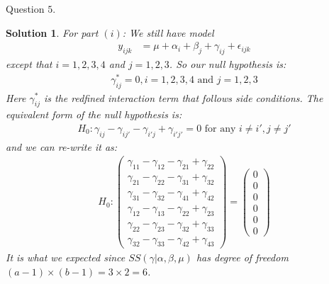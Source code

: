 \documentclass[11pt]{article}
\newtheorem{sol}{Solution}
\begin{document}
Question $5$.
\begin{sol}
	For part $(i)$:\vskip 2mm
	We still have model
	\begin{align*}
		y_{ijk} &= \mu + \alpha_i + \beta_j + \gamma_{ij} + \epsilon_{ijk}
	\end{align*}
	except that $i = 1, 2, 3, 4$ and $j = 1, 2, 3$. So our null hypothesis is:
	\begin{align*}
		\gamma^{\ast}_{ij} = 0, i = 1 , 2, 3, 4 \text{ and }j = 1, 2, 3
	\end{align*}
	Here $\gamma^{\ast}_{ij}$ is the redfined interaction term that follows side conditions.\vskip 2mm
	The equivalent form of the null hypothesis is:
	\begin{align*}
		H_0: \gamma_{ij} - \gamma_{ij'} - \gamma_{i'j} + \gamma_{i'j'} = 0 \text{ for any }i \neq i', j \neq j'
	\end{align*}
	and we can re-write it as:
	\begin{align*}
		H_0: \left(\begin{array}{c} \gamma_{11} - \gamma_{12} - \gamma_{21} + \gamma_{22}\\ \gamma_{21} - \gamma_{22} - \gamma_{31} + \gamma_{32}\\ \gamma_{31} - \gamma_{32} - \gamma_{41} + \gamma_{42}\\ \gamma_{12} - \gamma_{13} - \gamma_{22} + \gamma_{23} \\ \gamma_{22} - \gamma_{23} - \gamma_{32} + \gamma_{33}\\ \gamma_{32} - \gamma_{33} - \gamma_{42} + \gamma_{43}\end{array}\right) = \left(\begin{array}{c} 0\\ 0\\ 0\\ 0\\ 0\\0 \end{array}\right)
	\end{align*}
	It is what we expected since $SS(\gamma|\alpha, \beta, \mu)$ has degree of freedom $(a-1) \times (b - 1) = 3 \times 2 = 6$.

\end{sol}
\end{document}
